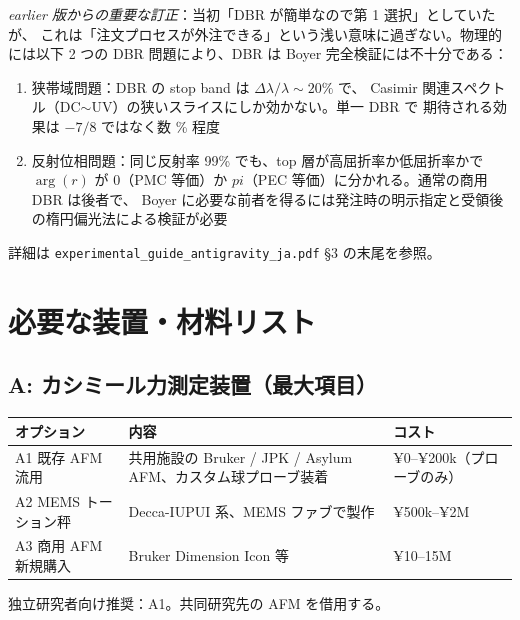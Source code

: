 \documentclass[11pt,a4paper]{article}
\def\pi{pi}%
\def\textbf#1{#1}%
\begin{document}
\textbf{\emph{earlier 版からの重要な訂正}}：当初「DBR が簡単なので第 1 選択」としていたが、
これは「注文プロセスが外注できる」という浅い意味に過ぎない。物理的には以下 2 つの
DBR 問題により、\textbf{DBR は Boyer 完全検証には不十分}である：

\begin{enumerate}
\item \textbf{狭帯域問題}：DBR の stop band は $\Delta\lambda/\lambda \sim 20\%$ で、
  Casimir 関連スペクトル（DC$\sim$UV）の狭いスライスにしか効かない。単一 DBR で
  期待される効果は $-7/8$ ではなく数 \% 程度
\item \textbf{反射位相問題}：同じ反射率 99\% でも、top 層が高屈折率か低屈折率かで
  $\arg(r)$ が 0（PMC 等価）か $\pi$（PEC 等価）に分かれる。通常の商用 DBR は後者で、
  Boyer に必要な前者を得るには発注時の明示指定と受領後の楕円偏光法による検証が必要
\end{enumerate}

詳細は \texttt{experimental\_guide\_antigravity\_ja.pdf} §3 の末尾を参照。

\newpage

\section{必要な装置・材料リスト}

\subsection{A: カシミール力測定装置（最大項目）}

\begin{center}
\begin{tabular}{p{}p{}p{}}
\toprule
オプション & 内容 & コスト \\
\midrule
A1 既存 AFM 流用 & 共用施設の Bruker / JPK / Asylum AFM、カスタム球プローブ装着 & ¥0--¥200k（プローブのみ） \\
A2 MEMS トーション秤 & Decca-IUPUI 系、MEMS ファブで製作 & ¥500k--¥2M \\
A3 商用 AFM 新規購入 & Bruker Dimension Icon 等 & ¥10--15M \\
\bottomrule
\end{tabular}
\end{center}

\textbf{独立研究者向け推奨：A1}。共同研究先の AFM を借用する。
\end{document}
